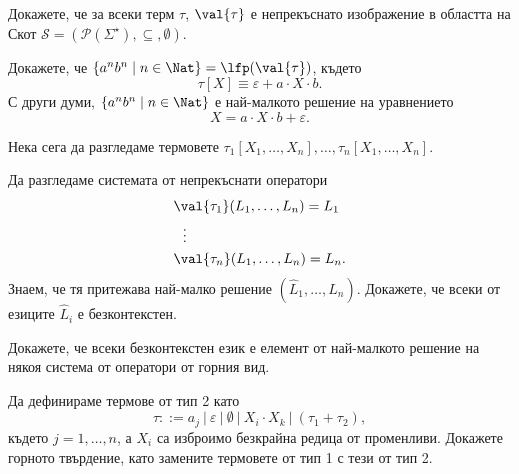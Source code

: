 \begin{problem}
  Докажете, че за всеки терм $\tau$, $\val{\tau}$ е непрекъснато изображение в областта на Скот
  $\mathcal{S} = ( \mathcal{P}(\Sigma^\star),\subseteq, \emptyset)$.
\end{problem}

\begin{problem}
  Докажете, че $\{a^nb^n \mid n\in \Nat\} = \lfp(\val{\tau})$, където 
  \[\tau[X] \equiv \varepsilon + a \cdot X \cdot b.\]
  С други думи, $\{a^nb^n \mid n \in \Nat\}$ е най-малкото решение на уравнението
  \[X = a \cdot X \cdot b + \varepsilon.\]
\end{problem}

Нека сега да разгледаме термовете $\tau_1[X_1,\dots,X_n], \dots, \tau_n[X_1,\dots,X_n]$.

\begin{problem}
  Да разгледаме системата от непрекъснати оператори
  \begin{align*}
    & \val{\tau_1}(L_1,\dots,L_n) = L_1\\
    & \ \ \vdots\\
    & \val{\tau_n}(L_1,\dots,L_n) = L_n.
  \end{align*}
  Знаем, че тя притежава най-малко решение $(\hat{L}_1,\dots,\hat{L}_n)$.
  Докажете, че всеки от езиците $\hat{L}_i$ е безконтекстен.

  Докажете, че всеки безконтекстен език е елемент от най-малкото решение 
  на някоя система от оператори от горния вид.
\end{problem}

\begin{problem}
  Да дефинираме термове от тип 2 като
  \[\tau ::= a_j\ |\ \varepsilon\ |\ \emptyset\ |\ X_i \cdot X_k\ |\ (\tau_1 + \tau_2),\]
  където $j = 1, \dots,n$, а $X_i$ са изброимо безкрайна редица от променливи.
  Докажете горното твърдение, като замените термовете от тип 1 с тези от тип 2.
\end{problem}

